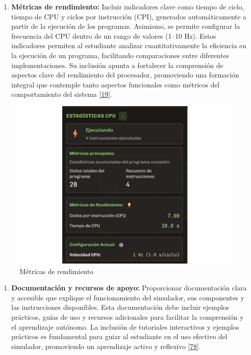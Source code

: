 \documentclass[12pt,oneside]{templates/unerthesis}
\providecommand{\tightlist}{%
  \setlength{\itemsep}{0pt}\setlength{\parskip}{0pt}}
\begin{document}
\begin{enumerate}
\def\labelenumi{\arabic{enumi}.}
\setcounter{enumi}{5}
\tightlist
\item
  \textbf{Métricas de rendimiento:}
  Incluir indicadores clave como tiempo de ciclo, tiempo de CPU y ciclos por instrucción (CPI), generados automáticamente a partir de la ejecución de los programas. Asimismo, se permite configurar la frecuencia del CPU dentro de un rango de valores (1--10 Hz). Estos indicadores permiten al estudiante analizar cuantitativamente la eficiencia en la ejecución de un programa, facilitando comparaciones entre diferentes implementaciones. Su inclusión apunta a fortalecer la comprensión de aspectos clave del rendimiento del procesador, promoviendo una formación integral que contemple tanto aspectos funcionales como métricos del comportamiento del sistema \protect\hyperlink{ref-hennessy2017computer}{{[}19{]}}.
\end{enumerate}

\begin{figure}

{\centering \includegraphics[width=0.85\linewidth]{images/metricas} 

}

\caption{Métricas de rendimiento}\label{fig:metricas}
\end{figure}

\begin{enumerate}
\def\labelenumi{\arabic{enumi}.}
\setcounter{enumi}{6}
\tightlist
\item
  \textbf{Documentación y recursos de apoyo:}
  Proporcionar documentación clara y accesible que explique el funcionamiento del simulador, sus componentes y las instrucciones disponibles. Esta documentación debe incluir ejemplos prácticos, guías de uso y recursos adicionales para facilitar la comprensión y el aprendizaje autónomo. La inclusión de tutoriales interactivos y ejemplos prácticos es fundamental para guiar al estudiante en el uso efectivo del simulador, promoviendo un aprendizaje activo y reflexivo \protect\hyperlink{ref-bonwell1991active}{{[}78{]}}.
\end{enumerate}
\end{document}
